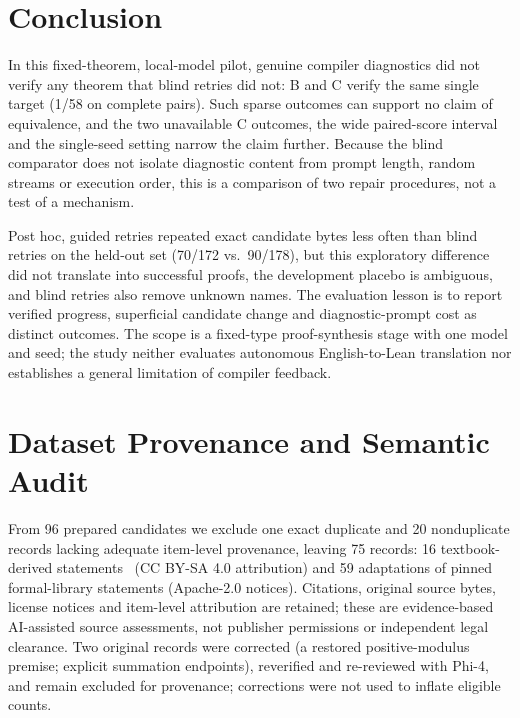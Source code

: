 \documentclass[runningheads,a4paper]{llncs}
\begin{document}
\section{Conclusion}
In this fixed-theorem, local-model pilot, genuine compiler diagnostics did not
verify any theorem that blind retries did not: B and C verify the same single
target (1/58 on complete pairs). Such sparse outcomes can support no claim of
equivalence, and the two unavailable C outcomes, the wide paired-score interval and
the single-seed setting narrow the claim further. Because the blind comparator does not isolate diagnostic content from prompt length, random streams or execution order, this is a comparison of two repair procedures, not a test of a mechanism.

Post hoc, guided retries repeated exact candidate bytes less often than blind
retries on the held-out set (70/172 vs.\ 90/178), but this exploratory difference
did not translate into successful proofs, the development placebo is ambiguous, and
blind retries also remove unknown names. The evaluation lesson is to
report verified progress, superficial candidate change and diagnostic-prompt cost as
distinct outcomes. The scope is a fixed-type proof-synthesis stage with one model
and seed; the study neither evaluates autonomous English-to-Lean translation nor
establishes a general limitation of compiler feedback.

\appendix
\section{Dataset Provenance and Semantic Audit}
From 96 prepared candidates we exclude one exact duplicate and 20 nonduplicate
records lacking adequate item-level provenance, leaving 75 records: 16
textbook-derived statements~\cite{levin2021dmoi} (CC BY-SA 4.0 attribution) and 59
adaptations of pinned formal-library statements (Apache-2.0 notices). Citations,
original source bytes, license notices and item-level attribution are retained;
these are evidence-based AI-assisted source assessments, not publisher permissions
or independent legal clearance. Two original records were corrected (a restored
positive-modulus premise; explicit summation endpoints), reverified and re-reviewed
with Phi-4, and remain excluded for provenance; corrections were not used to inflate
eligible counts.
\end{document}
